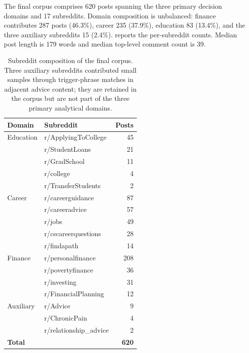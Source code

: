 The final corpus comprises 620 posts spanning the three primary
decision domains and 17 subreddits. Domain composition is unbalanced:
finance contributes 287 posts (46.3\%), career 235 (37.9\%), education
83 (13.4\%), and the three auxiliary subreddits 15 (2.4\%).
 reports the per-subreddit counts. Median post
length is 179 words and median top-level comment count is 39.

\begin{table}[t]
  \centering
  \caption{Subreddit composition of the final corpus. Three auxiliary
    subreddits contributed small samples through trigger-phrase matches
    in adjacent advice content; they are retained in the corpus but
    are not part of the three primary analytical domains.}
  \label{tab:m_subreddits}
  \begin{tabular}{llr}
    \toprule
    Domain & Subreddit & Posts \\
    \midrule
    Education & r/ApplyingToCollege  & 45  \\
              & r/StudentLoans       & 21  \\
              & r/GradSchool         & 11  \\
              & r/college            & 4   \\
              & r/TransferStudents   & 2   \\
    \midrule
    Career    & r/careerguidance     & 87  \\
              & r/careeradvice       & 57  \\
              & r/jobs               & 49  \\
              & r/cscareerquestions  & 28  \\
              & r/findapath          & 14  \\
    \midrule
    Finance   & r/personalfinance    & 208 \\
              & r/povertyfinance     & 36  \\
              & r/investing          & 31  \\
              & r/FinancialPlanning  & 12  \\
    \midrule
    Auxiliary & r/Advice             & 9   \\
              & r/ChronicPain        & 4   \\
              & r/relationship\_advice & 2 \\
    \midrule
    \textbf{Total} &                 & \textbf{620} \\
    \bottomrule
  \end{tabular}
\end{table}

